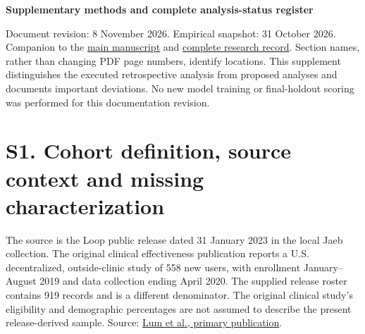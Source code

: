 \documentclass[11pt,a4paper]{article}
\begin{document}
{\raggedright{}\LARGE\bfseries Supplementary methods and complete analysis-status register\par}
\vspace{8pt}
Document revision: 8 November 2026. Empirical snapshot: 31 October 2026. Companion to the \href{manuscript.md}{main manuscript} and \href{../docs/research_master_record_2026_11_08.md}{complete research record}. Section names, rather than changing PDF page numbers, identify locations. This supplement distinguishes the executed retrospective analysis from proposed analyses and documents important deviations. No new model training or final-holdout scoring was performed for this documentation revision.

\section*{S1. Cohort definition, source context and missing characterization}
The source is the Loop public release dated 31 January 2023 in the local Jaeb collection. The original clinical effectiveness publication reports a U.S. decentralized, outside-clinic study of 558 new users, with enrollment January--August 2019 and data collection ending April 2020. The supplied release roster contains 919 records and is a different denominator. The original clinical study's eligibility and demographic percentages are not assumed to describe the present release-derived sample. Source: \href{https://journals.sagepub.com/doi/full/10.1089/dia.2020.0535}{Lum et al., primary publication}.
\end{document}
